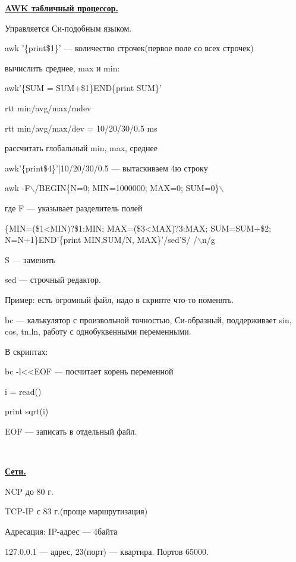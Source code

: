\par \underline{\textbf{AWK
табличный процессор.}}
\par 
Управляется Си-подобным языком.
\par 
awk '\{print\$1\}' — количество строчек(первое
поле со всех строчек)
\par 
вычислить среднее, max и min:
\par 
awk'\{SUM = SUM+\$1\}END\{print SUM\}'
\par 
rtt min/avg/max/mdev
\par 
rtt min/avg/max/dev = 10/20/30/0.5 ms
\par 
рассчитать глобальный min, max, среднее
\par 
awk'\{print\$4\}'|10/20/30/0.5 — вытаскиваем 4ю строку
\par 
awk -F$\backslash$/BEGIN\{N=0; MIN=1000000; MAX=0; SUM=0\}$\backslash$
\par 
где F — указывает разделитель полей
\par 
\{MIN=(\$1<MIN)?\$1:MIN; MAX=(\$3<MAX)?3:MAX; SUM=SUM+\$2;
N=N+1\}END'\{print MIN,SUM/N, MAX\}'/sed'S/ /$\backslash$n/g
\par 
S — заменить
\par 
sed — строчный редактор.
\par 
Пример: есть огромный файл, надо в скрипте
что-то поменять.
\par 
bc — калькулятор с произвольной точностью,
Си-образный, поддерживает sin, cos, tn,ln,
работу с однобуквенными переменными.
\par 
В скриптах:
\par 
bc -l<<EOF — посчитает корень переменной
\par 
i = read()
\par 
print sqrt(i)
\par 
EOF — записать в отдельный файл.
\par 
\\

\par \underline{\textbf{Сети.}}
\par 
NCP до 80 г.
\par 
TCP-IP с 83 г.(проще маршрутизация)
\par 
Адресация: IP-адрес — 4байта
\par 
127.0.0.1 — адрес, 23(порт) — квартира. Портов
65000. 

